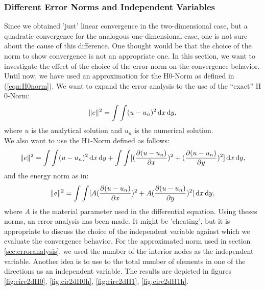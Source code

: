\documentclass[a4paper,12pt]{article}
\newcommand{\intd}{\,{\rm d}}
\begin{document}
\subsubsection{Different Error Norms and Independent Variables}\label{sec:differrnorms}
Since we obtained 'just' linear convergence in the two-dimensional case, but a quadratic convergence for the analogous one-dimensional case, one is not sure about the cause of this difference. One thought would be that the choice of the norm to show convergence is not an appropriate one. In this section, we want to investigate the effect of the choice of the error norm on the convergence behavior. Until now, we have used an approximation for the H$0$-Norm as defined in (\ref{eqn:H0norm}). We want to expand the error analysis to the use of the ``exact'' H$0$-Norm:
\begin{equation}
\Vert e \Vert^2 = \int \int (u-u_n)^2 \intd x \intd y,
\end{equation}
where $u$ is the analytical solution and $u_n$ is the numerical solution.\\
We also want to use the H$1$-Norm defined as follows:
\begin{equation}
\Vert e \Vert^2 = \int \int (u-u_n)^2 \intd x \intd y + \int \int [(\frac{\partial(u-u_n)}{\partial x})^2 + (\frac{\partial(u-u_n)}{\partial y})^2] \intd x \intd y,
\end{equation}
and the energy norm as in:
\begin{equation}
\Vert e \Vert^2 =  \int \int [A(\frac{\partial(u-u_n)}{\partial x})^2 + A(\frac{\partial(u-u_n)}{\partial y})^2] \intd x \intd y,
\end{equation}
where $A$ is the material parameter used in the differential equation. 
Using theses norms, an error analysis has been made. It might be 'cheating', but it is appropriate to discuss the choice of the independent variable against which we evaluate the convergence behavior. For the approximated norm used in section \ref{sec:erroranalysis}, we used the number of the interior nodes as the independent variable. Another idea is to use to the total number of elements in one of the directions as an independent variable. The results are depicted in figures  \ref{fig:circ2dH0}, \ref{fig:cir2dH0h}, \ref{fig:circ2dH1}, \ref{fig:circ2dH1h}.
\end{document}
